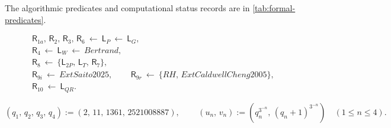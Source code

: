 \documentclass[11pt,reqno]{amsart}
\makeatletter
\theoremstyle{blueplain}
\newcommand{\defref}[1]{\hyperref[#1]{Definition~\ref*{#1}}}
\providecommand{\comma}{\allowbreak,\,}
\numberwithin{equation}{section}
\DeclareRobustCommand{\defref}[1]{%
  \hyperlink{def:#1}{\ensuremath{\csname PredicateName@#1\endcsname}}}
\DeclareRobustCommand{\proofref}[2]{\hyperlink{proof:#1}{\ensuremath{#2}}}
\def\defref#1{#1}%
\def\proofref#1#2{#2}%
\def\hyperlink#1#2{#2}}
\makeatother
\begin{document}
{%

The algorithmic predicates and computational status records are in \cref{tab:formal-predicates}.

\[
\begin{gathered}
\proofref{R-1a}{\textsf{R}_{1a}}\comma \proofref{R-2}{\textsf{R}_2}\comma \proofref{R-3}{\textsf{R}_3}\comma \proofref{R-6}{\textsf{R}_6}\ \longleftarrow\ \proofref{L-P}{\textsf{L}_P}\ \longleftarrow\ \proofref{L-G}{\textsf{L}_G}\comma \\
\proofref{R-4}{\textsf{R}_4}\ \longleftarrow\ \proofref{L-W}{\textsf{L}_W}\ \longleftarrow\ \defref{Bertrand}\comma \\
\proofref{R-8}{\textsf{R}_8}\ \longleftarrow\ \{\proofref{L-2P}{\textsf{L}_{2P}}\comma \proofref{L-T}{\textsf{L}_T}\comma \proofref{R-7}{\textsf{R}_7}\}\comma \\
\proofref{R-9i}{\textsf{R}_{9i}}\ \longleftarrow\ \defref{ExtSaito2025}\comma \qquad
\proofref{R-9r}{\textsf{R}_{9r}}\ \longleftarrow\ \{\defref{RH}\comma \defref{ExtCaldwellCheng2005}\}\comma \\
\proofref{R-10}{\textsf{R}_{10}}\ \longleftarrow\ \proofref{L-QR}{\textsf{L}_{QR}}.
\end{gathered}
\]

\[
(q_1\comma q_2\comma q_3\comma q_4):=(2\comma 11\comma 1361\comma 2521008887)\comma \qquad
(u_n\comma v_n):=(q_n^{3^{-n}}\comma (q_n+1)^{3^{-n}})\quad(1\le n\le4).
\]


}
\end{document}
